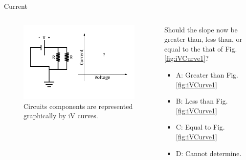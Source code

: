 \documentclass{beamer}
\begin{document}
\begin{frame}{Current}
\begin{columns}[T]
\begin{column}{0.5\textwidth}
\begin{figure}
\centering
\includegraphics[width=\textwidth,trim=0.5cm 0cm 1cm 0cm,clip=true]{figures/iVCurve3.pdf}
\caption{\label{fig:iVCurve3} Circuits components are represented graphically by iV curves.}
\end{figure}
\end{column}
\begin{column}{0.5\textwidth}
\small
Should the slope now be greater than, less than, or equal to the that of Fig. \ref{fig:iVCurve1}?
\begin{itemize}
\item A: Greater than Fig. \ref{fig:iVCurve1}
\item B: Less than Fig. \ref{fig:iVCurve1}
\item C: Equal to Fig. \ref{fig:iVCurve1}
\item D: Cannot determine.
\end{itemize}
\end{column}
\end{columns}
\end{frame}
\end{document}
